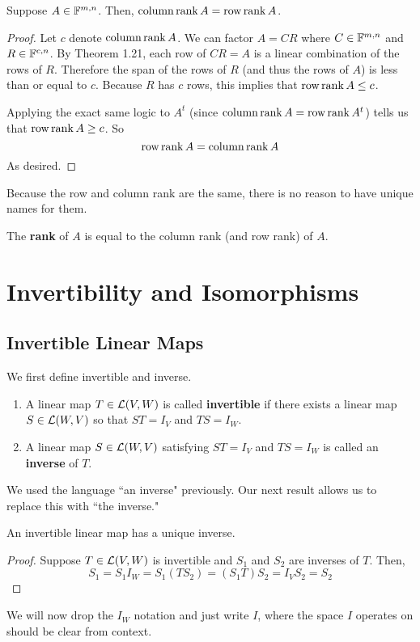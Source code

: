 \begin{theorem}
    Suppose $A\in\mathbb F^{m,n}$. Then, $\operatorname{column} \operatorname{rank} A = \operatorname{row} \operatorname{rank} A$.
\end{theorem}
\begin{proof}
    Let $c$ denote $\operatorname{column} \operatorname{rank} A$. We can factor $A=CR$ where $C\in\mathbb F^{m,n}$ and $R\in\mathbb F^{c,n}$. By Theorem 1.21, each row of $CR=A$ is a linear combination of the rows of $R$. Therefore the span of the rows of $R$ (and thus the rows of $A$) is less than or equal to $c$. Because $R$ has $c$ rows, this implies that $\operatorname{row} \operatorname{rank} A \le c$. 

    Applying the exact same logic to $A^t$ (since $\operatorname{column} \operatorname{rank} A = \operatorname{row} \operatorname{rank} A^t$) tells us that $\operatorname{row} \operatorname{rank} A \ge c$. So 
    \[ \operatorname{row} \operatorname{rank} A = \operatorname{column} \operatorname{rank} A\]
    As desired.
\end{proof}
Because the row and column rank are the same, there is no reason to have unique names for them.
\begin{definition}[Rank]
    The \textbf{rank} of $A$ is equal to the column rank (and row rank) of $A$.
\end{definition}
\section{Invertibility and Isomorphisms}
\subsection*{Invertible Linear Maps}
We first define invertible and inverse.
\begin{definition}
    \begin{enumerate}
        \item A linear map $T\in\mathcal{L}(V,W)$ is called \textbf{invertible} if there exists a linear map $S\in\mathcal{L}(W,V)$ so that $ST = I_V$ and $TS = I_W$.
        \item A linear map $S\in\mathcal{L}(W,V)$ satisfying $ST = I_V$ and $TS = I_W$ is called an \textbf{inverse} of $T$.
    \end{enumerate}
\end{definition}
We used the language ``an inverse" previously. Our next result allows us to replace this with ``the inverse." 
\begin{theorem}
    An invertible linear map has a unique inverse.
\end{theorem}
\begin{proof}
    Suppose $T\in\mathcal{L}(V,W)$ is invertible and $S_1$ and $S_2$ are inverses of $T$. Then,
    \[ S_1 = S_1I_W = S_1(TS_2) = (S_1T)S_2 = I_VS_2 = S_2\]
\end{proof}
We will now drop the $I_W$ notation and just write $I$, where the space $I$ operates on should be clear from context.

